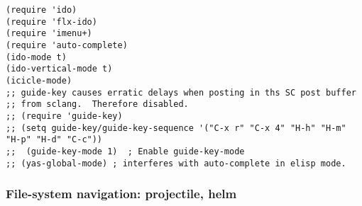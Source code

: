 \documentclass{article}
\begin{document}
\begin{verbatim}
(require 'ido)
(require 'flx-ido)
(require 'imenu+)
(require 'auto-complete)
(ido-mode t)
(ido-vertical-mode t)
(icicle-mode)
;; guide-key causes erratic delays when posting in ths SC post buffer
;; from sclang.  Therefore disabled.
;; (require 'guide-key)
;; (setq guide-key/guide-key-sequence '("C-x r" "C-x 4" "H-h" "H-m" "H-p" "H-d" "C-c"))
;;  (guide-key-mode 1)  ; Enable guide-key-mode
;; (yas-global-mode) ; interferes with auto-complete in elisp mode.
\end{verbatim}

\subsubsection{File-system navigation: projectile, helm}
\label{sec-1-11-9}
\end{document}

